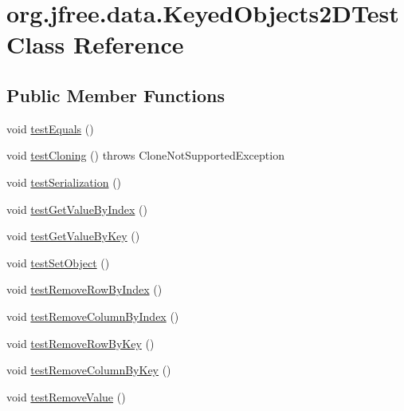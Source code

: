 \hypertarget{classorg_1_1jfree_1_1data_1_1_keyed_objects2_d_test}{}\section{org.\+jfree.\+data.\+Keyed\+Objects2\+D\+Test Class Reference}
\label{classorg_1_1jfree_1_1data_1_1_keyed_objects2_d_test}
\subsection*{Public Member Functions}
\begin{DoxyCompactItemize}
\item 
void \mbox{\hyperlink{classorg_1_1jfree_1_1data_1_1_keyed_objects2_d_test_ab6b7e545132e4dad4f2ef30b77e0a4c4}{test\+Equals}} ()
\item 
void \mbox{\hyperlink{classorg_1_1jfree_1_1data_1_1_keyed_objects2_d_test_ae4fab708fe6f2a1d1f6713abacc53dba}{test\+Cloning}} ()  throws Clone\+Not\+Supported\+Exception 
\item 
void \mbox{\hyperlink{classorg_1_1jfree_1_1data_1_1_keyed_objects2_d_test_a590dc629c8e14513769bf22a1a97a290}{test\+Serialization}} ()
\item 
void \mbox{\hyperlink{classorg_1_1jfree_1_1data_1_1_keyed_objects2_d_test_a97c5e35f278e232e4a1cf449b246c7c6}{test\+Get\+Value\+By\+Index}} ()
\item 
void \mbox{\hyperlink{classorg_1_1jfree_1_1data_1_1_keyed_objects2_d_test_a2e0d4cb9b1f458872d57170647e4e48a}{test\+Get\+Value\+By\+Key}} ()
\item 
void \mbox{\hyperlink{classorg_1_1jfree_1_1data_1_1_keyed_objects2_d_test_abf42be762da76e5c3773c06e4d5bc339}{test\+Set\+Object}} ()
\item 
void \mbox{\hyperlink{classorg_1_1jfree_1_1data_1_1_keyed_objects2_d_test_a86d1bdd0f576b0e5adab60b0ccd9779b}{test\+Remove\+Row\+By\+Index}} ()
\item 
void \mbox{\hyperlink{classorg_1_1jfree_1_1data_1_1_keyed_objects2_d_test_a45bf669273d4c913f0e7f04c37b23cec}{test\+Remove\+Column\+By\+Index}} ()
\item 
void \mbox{\hyperlink{classorg_1_1jfree_1_1data_1_1_keyed_objects2_d_test_a233f8d466b2b19c31ba54ea2803dd92f}{test\+Remove\+Row\+By\+Key}} ()
\item 
void \mbox{\hyperlink{classorg_1_1jfree_1_1data_1_1_keyed_objects2_d_test_ae0af1839b4594bd5c8c46d54984f9fde}{test\+Remove\+Column\+By\+Key}} ()
\item 
void \mbox{\hyperlink{classorg_1_1jfree_1_1data_1_1_keyed_objects2_d_test_afa110615930107d8ac02ee76983f4fc4}{test\+Remove\+Value}} ()
\end{DoxyCompactItemize}


